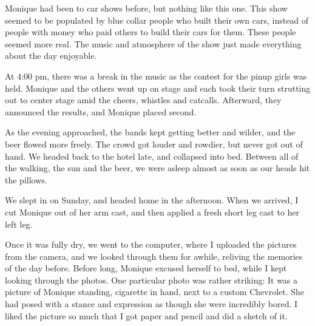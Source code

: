 \begin{thought}
Monique had been to car shows before, but nothing like this one. This show seemed to be
populated by blue collar people who built their own cars, instead of people with money who paid
others to build their cars for them. These people seemed more real. The music and atmosphere of
the show just made everything about the day enjoyable.
\end{thought}

At 4:00 pm, there was a break in the music as the contest for the pinup girls was held.
Monique and the others went up on stage and each took their turn strutting out to center stage
amid the cheers, whistles and catcalls. Afterward, they announced the results, and Monique
placed second.

As the evening approached, the bands kept getting better and wilder, and the beer flowed more
freely. The crowd got louder and rowdier, but never got out of hand. We headed back to the hotel
late, and collapsed into bed. Between all of the walking, the sun and the beer, we were asleep
almost as soon as our heads hit the pillows.

We slept in on Sunday, and headed home in the afternoon. When we arrived, I cut Monique out of
her arm cast, and then applied a fresh short leg cast to her left leg.

Once it was fully dry, we went to the computer, where I uploaded the pictures from the camera,
and we looked through them for awhile, reliving the memories of the day before. Before long,
Monique excused herself to bed, while I kept looking through the photos. One particular photo
was rather striking: It was a picture of Monique standing, cigarette in hand, next to a custom
Chevrolet. She had posed with a stance and expression as though she were incredibly bored. I
liked the picture so much that I got paper and pencil and did a sketch of it.

